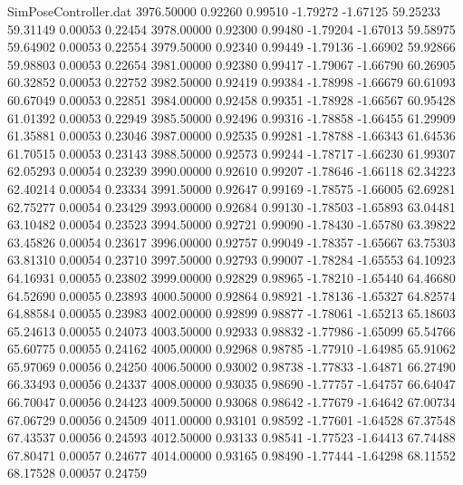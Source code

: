 \begin{filecontents}{SimPoseController.dat}
3976.50000    0.92260    0.99510    -1.79272   -1.67125   59.25233   59.31149    0.00053    0.22454
3978.00000    0.92300    0.99480    -1.79204   -1.67013   59.58975   59.64902    0.00053    0.22554
3979.50000    0.92340    0.99449    -1.79136   -1.66902   59.92866   59.98803    0.00053    0.22654
3981.00000    0.92380    0.99417    -1.79067   -1.66790   60.26905   60.32852    0.00053    0.22752
3982.50000    0.92419    0.99384    -1.78998   -1.66679   60.61093   60.67049    0.00053    0.22851
3984.00000    0.92458    0.99351    -1.78928   -1.66567   60.95428   61.01392    0.00053    0.22949
3985.50000    0.92496    0.99316    -1.78858   -1.66455   61.29909   61.35881    0.00053    0.23046
3987.00000    0.92535    0.99281    -1.78788   -1.66343   61.64536   61.70515    0.00053    0.23143
3988.50000    0.92573    0.99244    -1.78717   -1.66230   61.99307   62.05293    0.00054    0.23239
3990.00000    0.92610    0.99207    -1.78646   -1.66118   62.34223   62.40214    0.00054    0.23334
3991.50000    0.92647    0.99169    -1.78575   -1.66005   62.69281   62.75277    0.00054    0.23429
3993.00000    0.92684    0.99130    -1.78503   -1.65893   63.04481   63.10482    0.00054    0.23523
3994.50000    0.92721    0.99090    -1.78430   -1.65780   63.39822   63.45826    0.00054    0.23617
3996.00000    0.92757    0.99049    -1.78357   -1.65667   63.75303   63.81310    0.00054    0.23710
3997.50000    0.92793    0.99007    -1.78284   -1.65553   64.10923   64.16931    0.00055    0.23802
3999.00000    0.92829    0.98965    -1.78210   -1.65440   64.46680   64.52690    0.00055    0.23893
4000.50000    0.92864    0.98921    -1.78136   -1.65327   64.82574   64.88584    0.00055    0.23983
4002.00000    0.92899    0.98877    -1.78061   -1.65213   65.18603   65.24613    0.00055    0.24073
4003.50000    0.92933    0.98832    -1.77986   -1.65099   65.54766   65.60775    0.00055    0.24162
4005.00000    0.92968    0.98785    -1.77910   -1.64985   65.91062   65.97069    0.00056    0.24250
4006.50000    0.93002    0.98738    -1.77833   -1.64871   66.27490   66.33493    0.00056    0.24337
4008.00000    0.93035    0.98690    -1.77757   -1.64757   66.64047   66.70047    0.00056    0.24423
4009.50000    0.93068    0.98642    -1.77679   -1.64642   67.00734   67.06729    0.00056    0.24509
4011.00000    0.93101    0.98592    -1.77601   -1.64528   67.37548   67.43537    0.00056    0.24593
4012.50000    0.93133    0.98541    -1.77523   -1.64413   67.74488   67.80471    0.00057    0.24677
4014.00000    0.93165    0.98490    -1.77444   -1.64298   68.11552   68.17528    0.00057    0.24759

\end{filecontents}
